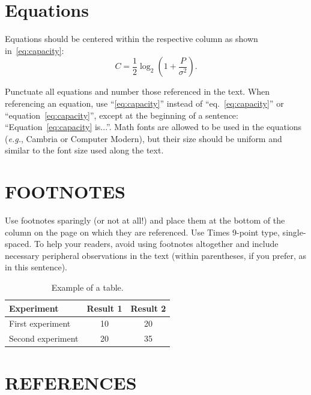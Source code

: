 \documentclass[a4paper]{article}
\begin{document}
\section{Equations}
Equations should be centered within the respective column as shown in~\eqref{eq:capacity}:
%
\begin{equation}
C = \frac{1}{2}\log_2{\left(1+\frac{P}{\sigma^2}\right)}.
\label{eq:capacity}
\end{equation}
%

Punctuate all equations and number those referenced in the text. When referencing an equation, use ``\eqref{eq:capacity}'' instead of ``eq.~\eqref{eq:capacity}'' or ``equation~\eqref{eq:capacity}'', except at the beginning of a sentence: ``Equation~\eqref{eq:capacity} is...''. Math fonts are allowed to be used in the equations (\textit{e.g.}, Cambria or Computer Modern), but their size should be uniform and similar to the font size used along the text.


\section{FOOTNOTES}
\label{sec:foot}

Use footnotes sparingly (or not at all!) and place them at the bottom of the
column on the page on which they are referenced. Use Times 9-point type,
single-spaced. To help your readers, avoid using footnotes altogether and
include necessary peripheral observations in the text (within parentheses, if
you prefer, as in this sentence).


\begin{table}
\small
\begin{center}
\renewcommand{\arraystretch}{1.2}
\begin{tabular}{lcc}
\hline
\textbf{Experiment}    & \textbf{Result 1} & \textbf{Result 2} \\
\hline
First experiment  & 10 & 20 \\
Second experiment & 20 & 35 \\
\hline
\end{tabular}
\end{center}
\vspace*{-0.3cm}
\caption{Example of a table.}
\label{tab:res}
\end{table}


\section{REFERENCES}
\label{sec:ref}
\end{document}
